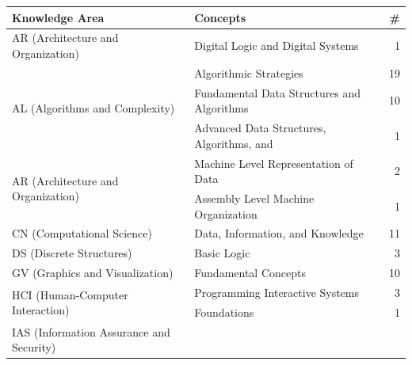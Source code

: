 \documentclass{sig-alternate-05-2015}
\begin{document}
\begin{table}[tb]
\begin{tabularx}{\linewidth}{|X|X|r|} \hline


Knowledge Area&


Concepts&


\#\\ \hline


AR (Architecture and Organization)&


Digital Logic and Digital Systems&


1\\ \hline
\multirow{3}{*}{AL (Algorithms and Complexity)}
&


Algorithmic Strategies&


19\\ \cline{2-3}
&


Fundamental Data Structures and Algorithms&


10\\ \cline{2-3}
&


Advanced Data Structures, Algorithms, and&


1\\ \hline
\multirow{2}{*}{AR (Architecture and Organization)}
&


Machine Level Representation of Data&


2\\ \cline{2-3}
&


Assembly Level Machine Organization&


1\\ \hline


CN (Computational Science)&


Data, Information, and Knowledge&


11\\ \hline


DS (Discrete Structures)&


Basic Logic&


3\\ \hline


GV (Graphics and Visualization)&


Fundamental Concepts&


10\\ \hline
\multirow{2}{*}{HCI (Human-Computer Interaction)}
&


Programming Interactive Systems&


3\\ \cline{2-3}
&


Foundations&


1\\ \hline
\multirow{4}{*}{IAS (Information Assurance and Security)}
&



\end{tabularx}
\end{table}
\end{document}
